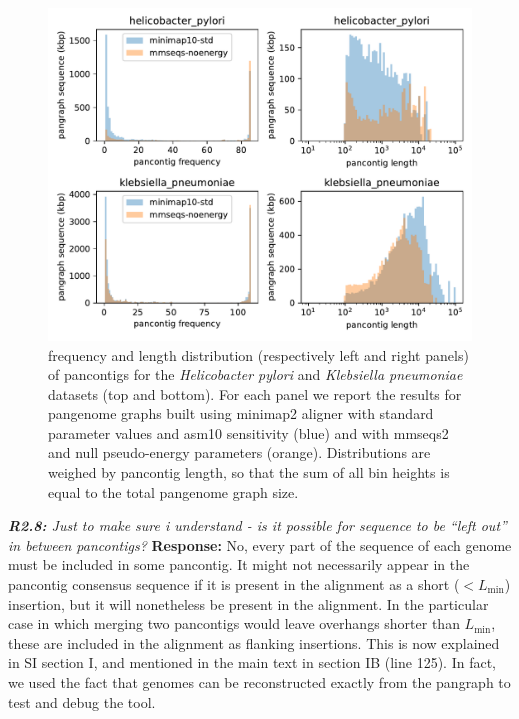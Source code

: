 \documentclass[aps,rmp,onecolumn]{revtex4-1}
\newcommand{\Lthr}{L_{\min}}
\newcommand{\reviewer}[2]{{\it \textbf{#1:} #2\vskip 5mm}}
\newcommand{\response}[1]{{{\color{response}\textbf{Response:} #1}}\vskip 5mm}
\newcommand{\SIgraph}{I}
\begin{document}
\begin{figure}[tb]
      \includegraphics[width=.7\textwidth]{figs_response/hp_vs_kp.pdf}
      \caption{frequency and length distribution (respectively left and right panels) of pancontigs for the \textit{Helicobacter pylori} and \textit{Klebsiella pneumoniae} datasets (top and bottom). For each panel we report the results for pangenome graphs built using minimap2 aligner with standard parameter values and asm10 sensitivity (blue) and with mmseqs2 and null pseudo-energy parameters (orange). Distributions are weighed by pancontig length, so that the sum of all bin heights is equal to the total pangenome graph size.}
      \label{fig:kp-vs-hp}
\end{figure}

\reviewer{R2.8}{Just to make sure i understand - is it possible for sequence to be ``left out'' in between pancontigs?}
\response{No, every part of the sequence of each genome must be included in some pancontig. 
It might not necessarily appear in the pancontig consensus sequence if it is present in the alignment as a short ($< \Lthr$) insertion, but it will nonetheless be present in the alignment. 
In the particular case in which merging two pancontigs would leave overhangs shorter than $\Lthr$, these are included in the alignment as flanking insertions. 
This is now explained in SI section {\SIgraph}, and mentioned in the main text in section IB (line 125).
In fact, we used the fact that genomes can be reconstructed exactly from the pangraph to test and debug the tool. }
\end{document}

